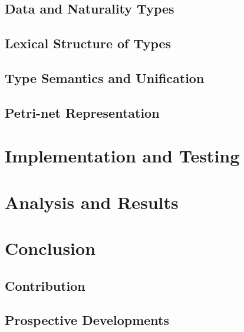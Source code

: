\documentclass[11pt,openright,hidelinks,a4paper]{article}
\begin{document}
\subsection{Data and Naturality Types}
\subsection{Lexical Structure of Types}
\subsection{Type Semantics and Unification}
\subsection{Petri-net Representation}

\section{Implementation and Testing}

\section{Analysis and Results}

\section{Conclusion}
\subsection{Contribution}
\subsection{Prospective Developments}
\end{document}
